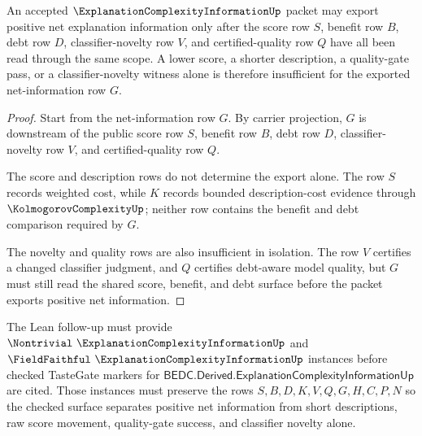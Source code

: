 \begin{theorem}
\label{thm:explanation-complexity-information-net-score-route}
An accepted $\ExplanationComplexityInformationUp$ packet may export positive net explanation information only after the score row $S$, benefit row $B$, debt row $D$, classifier-novelty row $V$, and certified-quality row $Q$ have all been read through the same scope. A lower score, a shorter description, a quality-gate pass, or a classifier-novelty witness alone is therefore insufficient for the exported net-information row $G$.
\end{theorem}
\begin{proof}
Start from the net-information row $G$. By carrier projection, $G$ is downstream of the public score row $S$, benefit row $B$, debt row $D$, classifier-novelty row $V$, and certified-quality row $Q$.

The score and description rows do not determine the export alone. The row $S$ records weighted cost, while $K$ records bounded description-cost evidence through $\KolmogorovComplexityUp$; neither row contains the benefit and debt comparison required by $G$.

The novelty and quality rows are also insufficient in isolation. The row $V$ certifies a changed classifier judgment, and $Q$ certifies debt-aware model quality, but $G$ must still read the shared score, benefit, and debt surface before the packet exports positive net information.
\end{proof}



The Lean follow-up must provide $\Nontrivial\ \ExplanationComplexityInformationUp$ and $\FieldFaithful\ \ExplanationComplexityInformationUp$ instances before checked TasteGate markers for $\mathsf{BEDC.Derived.ExplanationComplexityInformationUp}$ are cited. Those instances must preserve the rows $S,B,D,K,V,Q,G,H,C,P,N$ so the checked surface separates positive net information from short descriptions, raw score movement, quality-gate success, and classifier novelty alone.

